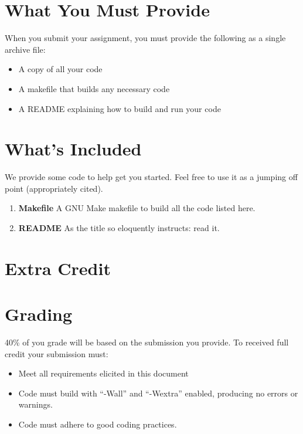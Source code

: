 \documentclass[12pt]{article}
\begin{document}
\section{What You Must Provide}

When you submit your assignment, you must provide the following as a
single archive file:
\begin{itemize}
\item A copy of all your code
\item A makefile that builds any necessary code
\item A README explaining how to build and run your code
\end{itemize}

\section{What's Included}

We provide some code to help get you started. Feel free to use it as a
jumping off point (appropriately cited).

\begin{enumerate}

\item {\bf Makefile} A GNU Make makefile to build all the code listed
  here.

\item {\bf README} As the title so eloquently instructs: read it.

\end{enumerate}

\section{Extra Credit}

\section{Grading}

40\% of you grade will be based on the submission you provide.
To received full credit your submission must:
\begin{itemize}
\item Meet all requirements elicited in this document
\item Code must build with ``-Wall'' and ``-Wextra'' enabled,
  producing no errors or warnings.
\item Code must adhere to good coding practices.
\end{itemize}
\end{document}
